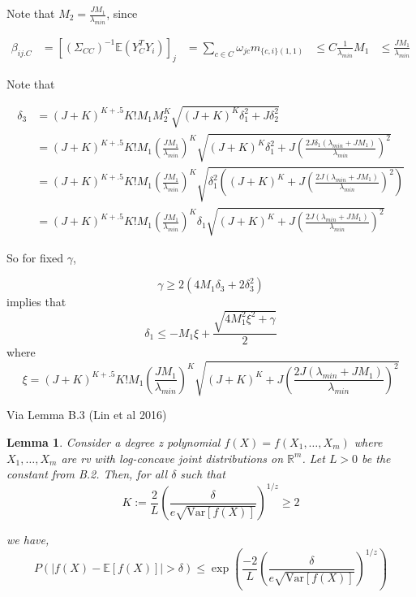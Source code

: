 \documentclass[]{article}
\newtheorem{lemma}{Lemma}
\newcommand{\E}{\mathbb{E}}
\begin{document}
Note that $M_2 = \frac{J M_1}{\lambda_{min}}$, since

\begin{equation}
\begin{aligned}
\beta_{ij.C} &= \left[(\Sigma_{CC})^{-1} \E(Y_C^T Y_i)\right]_j
& = \sum_{c \in C} \omega_{jc}m_{\{c,i\}(1,1)}
& \leq C\frac{1}{\lambda_{min}}M_1
& \leq \frac{J M_1}{\lambda_{min}}
\end{aligned}
\end{equation}

Note that

\begin{equation}
\begin{aligned}
\delta_3 & = (J +K)^{K + .5}K!M_1M_2^K \sqrt{(J+K)^K\delta_1^2 + J \delta_2^2}\\
&= (J +K)^{K + .5}K!M_1\left(\frac{J M_1}{\lambda_{min}}\right)^K \sqrt{(J+K)^K\delta_1^2 + J \left(\frac{2J \delta_1 \left( \lambda_{min} + J M_1\right)}{\lambda_{min}} \right)^2}
\\
&= (J +K)^{K + .5}K!M_1\left(\frac{J M_1}{\lambda_{min}}\right)^K \sqrt{\delta_1^2 \left((J+K)^K + J \left(\frac{2J\left( \lambda_{min} + J M_1\right)}{\lambda_{min}} \right)^2\right)}
\\
&= (J +K)^{K + .5}K!M_1\left(\frac{J M_1}{\lambda_{min}}\right)^K \delta_1\sqrt{ (J+K)^K + J \left(\frac{2J\left( \lambda_{min} + J M_1\right)}{\lambda_{min}} \right)^2}
\end{aligned}
\end{equation}

So for fixed $\gamma$,

\[\gamma \geq 2 \left(4M_1\delta_3 + 2\delta_3^2\right)\]
implies that
\begin{equation}
\delta_1 \leq -M_1\xi + \frac{\sqrt{4 M_1^2\xi^2 + \gamma}}{2}
\end{equation}
where
\[\xi = (J +K)^{K + .5}K!M_1\left(\frac{J M_1}{\lambda_{min}}\right)^K \sqrt{ (J+K)^K + J \left(\frac{2J\left( \lambda_{min} + J M_1\right)}{\lambda_{min}} \right)^2}\]

Via Lemma B.3 (Lin et al 2016)
\begin{lemma}
Consider a degree z polynomial $f(X) = f(X_1, \ldots, X_m)$ where $X_1, \ldots, X_m$ are rv with log-concave joint distributions on $\mathbb{R}^m$. Let $L > 0 $ be the constant from B.2. Then, for all $\delta$ such that
\[K:= \frac{2}{L} \left(\frac{\delta}{e\sqrt{\text{Var}\left[f(X)\right]}}\right)^{1/z} \geq 2\]

we have,
\[P(|f(X) - \mathbb{E}\left[f(X)\right] | > \delta ) \leq \exp\left(\frac{-2}{L} \left(\frac{\delta}{e\sqrt{\text{Var}\left[f(X)\right]}}\right)^{1/z}\right)\]
\end{lemma}
\end{document}
